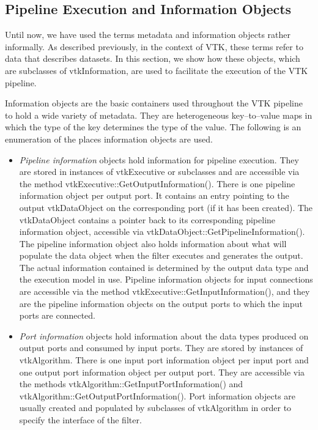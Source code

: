 \subsection{Pipeline Execution and Information Objects}
\label{subsec:pipeline_execution_and_information_objects}

Until now, we have used the terms metadata and information objects rather informally. As described previously, in the context of VTK, these terms refer to data that describes datasets. In this section, we show how these objects, which are subclasses of vtkInformation, are used to facilitate the execution of the VTK pipeline.

\begin{description}[leftmargin=0cm,labelindent=0cm]
\item[Information Objects.] Information objects are the basic containers used throughout the VTK pipeline to hold a wide variety of metadata. They are heterogeneous key--to--value maps in which the type of the key determines the type of the value. The following is an enumeration of the places information objects are used.

\begin{itemize}

\item \emph{Pipeline information} objects hold information for pipeline execution. They are stored in instances of vtkExecutive or subclasses and are accessible via the method vtkExecutive::GetOutputInformation(). There is one pipeline information object per output port. It contains an entry pointing to the output vtkDataObject on the corresponding port (if it has been created). The vtkDataObject contains a pointer back to its corresponding pipeline information object, accessible via vtkDataObject::GetPipelineInformation(). The pipeline information object also holds information about what will populate the data object when the filter executes and generates the output. The actual information contained is determined by the output data type and the execution model in use. Pipeline information objects for input connections are accessible via the method vtkExecutive::GetInputInformation(), and they are the pipeline information objects on the output ports to which the input ports are connected.

\item \emph{Port information} objects hold information about the data types produced on output ports and consumed by input ports. They are stored by instances of vtkAlgorithm. There is one input port information object per input port and one output port information object per output port. They are accessible via the methods vtkAlgorithm::GetInputPortInformation() and vtkAlgorithm::GetOutputPortInformation(). Port information objects are usually created and populated by subclasses of vtkAlgorithm in order to specify the interface of the filter.


\end{itemize}
\end{description}
